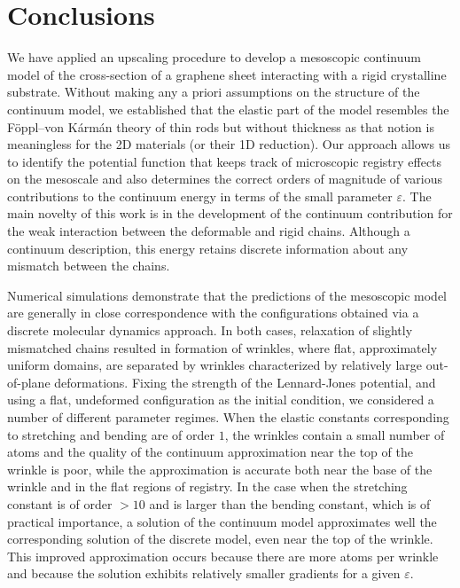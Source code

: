 \documentclass{siamltex}
\newcommand{\eps}{\varepsilon}
\begin{document}
\section{Conclusions}\label{sconc}

{We have applied an upscaling procedure to develop a mesoscopic
  continuum model of the cross-section of a graphene sheet interacting
  with a rigid crystalline substrate. Without making any a priori
  assumptions on the structure of the continuum model, we established
  that the elastic part of the model resembles the F\"oppl--von K\'arm\'an theory of thin
  rods but without thickness as that notion is meaningless for the 2D
  materials (or their 1D reduction). Our approach allows us to
  identify the potential function that keeps track of microscopic
  registry effects on the mesoscale and also determines the correct orders of magnitude of various contributions to the continuum energy in terms of the small parameter $\varepsilon$. The main novelty of this work is in the development of the continuum contribution for the weak interaction between the deformable and rigid chains.  Although a continuum description, this energy retains discrete information about any mismatch between the chains.}

{Numerical simulations demonstrate that the predictions of the
  mesoscopic model are generally in close correspondence with the
  configurations obtained via a  discrete molecular dynamics
  approach. In both cases, relaxation of slightly mismatched chains
  resulted in formation of wrinkles, where flat, approximately uniform
  domains, are separated by wrinkles characterized by relatively large
  out-of-plane deformations. Fixing the strength of the Lennard-Jones
  potential, and using a flat, undeformed configuration as the initial
  condition, we considered a number of different parameter
  regimes. When the elastic constants corresponding to stretching and
  bending are of order $1$, the wrinkles contain a small number of
  atoms and the quality of the continuum approximation near the top of
  the wrinkle is poor, while the approximation is accurate both near
  the base of the wrinkle and in the flat regions of registry. In the
  case when the stretching constant is of order
  $>10$ and is larger than the bending constant, which is of practical importance,  a solution of the
  continuum model approximates well the corresponding solution of the
  discrete model, even near the top of the wrinkle.  This improved
  approximation occurs because there are more atoms per wrinkle and
  because the solution exhibits relatively smaller gradients for a
  given $\eps$.}
  
\end{document}
